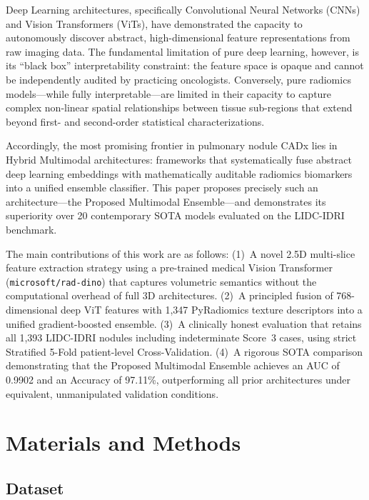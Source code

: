 \documentclass[AMA,STIX1COL]{WileyNJD-v2}
\begin{document}
Deep Learning architectures, specifically Convolutional Neural Networks (CNNs) and Vision Transformers (ViTs), have demonstrated the capacity to autonomously discover abstract, high-dimensional feature representations from raw imaging data. The fundamental limitation of pure deep learning, however, is its ``black box'' interpretability constraint: the feature space is opaque and cannot be independently audited by practicing oncologists. Conversely, pure radiomics models---while fully interpretable---are limited in their capacity to capture complex non-linear spatial relationships between tissue sub-regions that extend beyond first- and second-order statistical characterizations.

Accordingly, the most promising frontier in pulmonary nodule CADx lies in Hybrid Multimodal architectures: frameworks that systematically fuse abstract deep learning embeddings with mathematically auditable radiomics biomarkers into a unified ensemble classifier. This paper proposes precisely such an architecture---the Proposed Multimodal Ensemble---and demonstrates its superiority over 20 contemporary SOTA models evaluated on the LIDC-IDRI benchmark.

The main contributions of this work are as follows: (1)~A novel 2.5D multi-slice feature extraction strategy using a pre-trained medical Vision Transformer (\texttt{microsoft/rad-dino}) that captures volumetric semantics without the computational overhead of full 3D architectures. (2)~A principled fusion of 768-dimensional deep ViT features with 1,347 PyRadiomics texture descriptors into a unified gradient-boosted ensemble. (3)~A clinically honest evaluation that retains all 1,393 LIDC-IDRI nodules including indeterminate Score~3 cases, using strict Stratified 5-Fold patient-level Cross-Validation. (4)~A rigorous SOTA comparison demonstrating that the Proposed Multimodal Ensemble achieves an AUC of 0.9902 and an Accuracy of 97.11\%, outperforming all prior architectures under equivalent, unmanipulated validation conditions.


\section{Materials and Methods}\label{sec2}

\subsection{Dataset}
\end{document}
